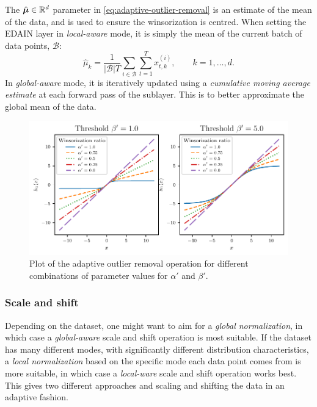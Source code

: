 \documentclass{statsmsc}
\begin{document}
{The $\hat{\bm\mu}\in \mathbb{R}^d$ parameter in \cref{eq:adaptive-outlier-removal} is an estimate of the mean of the data, and is used
to ensure the winsorization is centred. When setting the \ac{EDAIN} layer in \textit{local-aware}
mode, it is simply the mean of the current batch of data points, $\mathcal{B}$:
\begin{equation}
    \hat{\mu}_k=\frac{1}{|\mathcal{B}| T} \sum_{i \in \mathcal{B}} \sum_{t=1}^T x_{t,k}^{(i)}, \qquad k=1,\dots,d.
\end{equation}
In \textit{global-aware} mode, it is iteratively updated using a \textit{cumulative
moving average estimate} at each forward pass of the sublayer.
This is to better approximate the global mean of the data.

\begin{figure}
\begin{center}
    \includegraphics[scale=1.0]{figures/adaptive_outlier_removal.pdf}
\end{center}
\caption{Plot of the adaptive outlier removal operation for different combinations of parameter
values for $\alpha'$ and $\beta'$.}
\label{fig:adaptive_outlier}
\end{figure}



\subsubsection{Scale and shift}%
\label{ssub:Scale and shift}

Depending on the dataset, one might want to aim for a \textit{global
normalization}, in which case a \textit{global-aware} scale and shift operation is most
suitable. If the dataset has many different modes, with significantly different distribution characteristics, a \textit{local normalization} based on the specific mode each data point comes from is more suitable, in which case a \textit{local-ware} scale and shift
operation works best. This gives two different approaches and scaling and shifting the data in an adaptive fashion.

}
\end{document}
